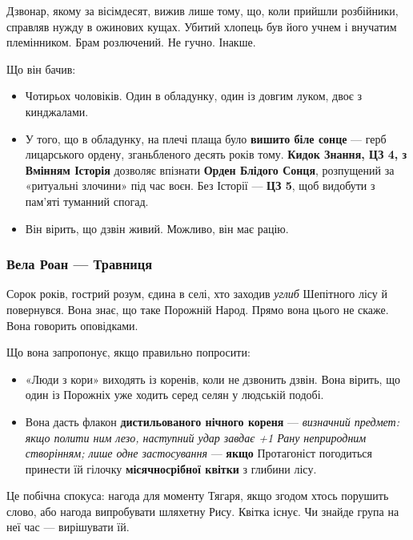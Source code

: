\documentclass[10pt,a4paper]{article}
\newcommand{\tightlist}{\setlength{\itemsep}{0pt}\setlength{\parskip}{0pt}}
\begin{document}
Дзвонар, якому за вісімдесят, вижив лише тому, що, коли прийшли розбійники, справляв нужду в ожинових кущах. Убитий хлопець був його учнем і внучатим племінником. Брам розлючений. Не гучно. Інакше.

Що він бачив:

\begin{itemize}
\tightlist
\item
  Чотирьох чоловіків. Один в обладунку, один із довгим луком, двоє з кинджалами.
\item
  У того, що в обладунку, на плечі плаща було \textbf{вишито біле сонце} --- герб лицарського ордену, зганьбленого десять років тому. \textbf{Кидок Знання, ЦЗ 4, з Вмінням Історія} дозволяє впізнати \textbf{Орден Блідого Сонця}, розпущений за «ритуальні злочини» під час воєн. Без Історії --- \textbf{ЦЗ 5}, щоб видобути з пам’яті туманний спогад.
\item
  Він вірить, що дзвін живий. Можливо, він має рацію.
\end{itemize}

\subsubsection{Вела Роан --- Травниця}\label{ux432ux435ux43bux430-ux440ux43eux430ux43d-ux442ux440ux430ux432ux43dux438ux446ux44f}

Сорок років, гострий розум, єдина в селі, хто заходив \emph{углиб} Шепітного лісу й повернувся. Вона знає, що таке Порожній Народ. Прямо вона цього не скаже. Вона говорить оповідками.

Що вона запропонує, якщо правильно попросити:

\begin{itemize}
\tightlist
\item
  «Люди з кори» виходять із коренів, коли не дзвонить дзвін. Вона вірить, що один із Порожніх уже ходить серед селян у людській подобі.
\item
  Вона дасть флакон \textbf{дистильованого нічного кореня} --- \emph{визначний предмет: якщо полити ним лезо, наступний удар завдає +1 Рану неприродним створінням; лише одне застосування} --- \textbf{якщо} Протагоніст погодиться принести їй гілочку \textbf{місячносрібної квітки} з глибини лісу.
\end{itemize}

Це побічна спокуса: нагода для моменту Тягаря, якщо згодом хтось порушить слово, або нагода випробувати шляхетну Рису. Квітка існує. Чи знайде група на неї час --- вирішувати їй.
\end{document}
